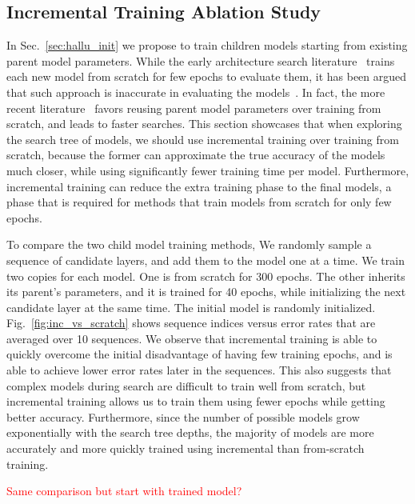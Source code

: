 \documentclass{article}
\newcommand{\todo}[1]{\textcolor{red}{#1}}
\begin{document}
\subsection{Incremental Training Ablation Study}
\label{sec:incremental_vs_from_scratch}
In Sec.~\ref{sec:hallu_init} we propose to train children models starting from existing parent model parameters. While the early architecture search literature~\citep{} trains each new model from scratch for few epochs to evaluate them, it has been argued that such approach is inaccurate in evaluating the models~\citep{}. In fact, the more recent literature~\citep{} favors reusing parent model parameters over training from scratch, and leads to faster searches. 
This section showcases that when exploring the search tree of models, we should use incremental training over training from scratch, because the former can approximate the true accuracy of the models much closer, while using significantly fewer training time per model. Furthermore, incremental training can reduce the extra training phase to the final models, a phase that is required for methods that train models from scratch for only few epochs.  

To compare the two child model training methods, We randomly sample a sequence of candidate layers, and add them to the model one at a time. We train two copies for each model. One is from scratch for 300 epochs. The other inherits its parent's parameters, and it is trained for 40 epochs, while initializing the next candidate layer at the same time. The initial model is randomly initialized. Fig.~\ref{fig:inc_vs_scratch} shows sequence indices versus error rates that are averaged over 10 sequences. We observe that incremental training is able to quickly overcome the initial disadvantage of having few training epochs, and is able to achieve lower error rates later in the sequences. This also suggests that complex models  during search are difficult to train well from scratch, but incremental training allows us to train them using fewer epochs while getting better accuracy. Furthermore, since the number of possible models grow exponentially with the search tree depths, the majority of models are more accurately and more quickly trained using incremental than from-scratch training.

\todo{Same comparison but start with trained model?}
\end{document}
